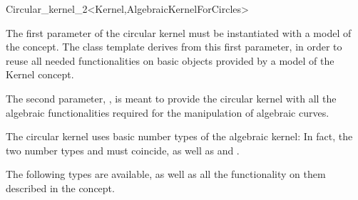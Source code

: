 \begin{ccRefClass}{Circular_kernel_2<Kernel,AlgebraicKernelForCircles>}


\ccIsModel


\ccParameters

The first parameter of the circular kernel must be instantiated with a
model of the  concept. The  class
template derives from this first parameter, in order to reuse all
needed functionalities on basic objects provided by a model of the
Kernel concept.

The second parameter, , is meant to provide the
circular kernel with all the algebraic functionalities required for the
manipulation of algebraic curves. 

\ccInheritsFrom


\ccTypes

\ccThreeToTwo

The circular kernel uses basic number types of the algebraic kernel:
In fact, the two number types  and
 must coincide, as well as
 and .

The following types are available, as well as all the functionality on
them described in the  concept. 

\ccGlue
{}
\ccGlue
{}

\ccSeeAlso

\\
\\

\end{ccRefClass}
